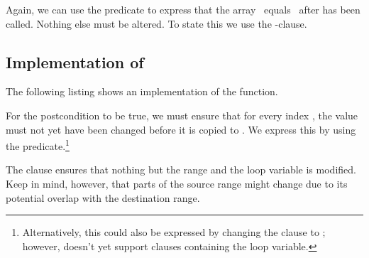 

Again, we can use the  predicate to express that the
array~ equals~ after \copyi has been called.
Nothing else must be altered.
To state this we use the -clause.


\subsection{Implementation of \copyi}

The following listing shows an implementation of the \copyi function.



For the postcondition \equal to be true, we must ensure that for every index
, the value  must not yet have been changed before it is 
copied to .
We express this by using the  \Unchanged predicate.\footnote{
Alternatively, this could also be expressed by changing the
 clause to ; however,
\framac doesn't yet support  clauses
containing the loop variable.
}

The  clause ensures that nothing but the range 
and the loop variable  is modified.
Keep in mind, however, that parts of the source range  might change
due to its potential overlap with the destination range.

\clearpage

